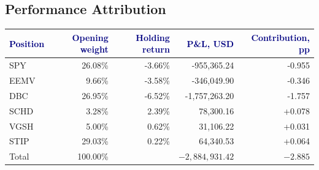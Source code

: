 \documentclass[10pt,a4paper]{article}
\newcommand{\hd}[1]{\textcolor{navy}{\textbf{#1}}}
\begin{document}
\subsection{Performance Attribution}
\begin{center}\small
\begin{tabular}{lrrrr}\toprule
\hd{Position}&\hd{Opening weight}&\hd{Holding return}&\hd{P\&L, USD}&\hd{Contribution, pp}\\\midrule
SPY & 26.08\% & -3.66\% & -955,365.24 & -0.955 \\
EEMV & 9.66\% & -3.58\% & -346,049.90 & -0.346 \\
DBC & 26.95\% & -6.52\% & -1,757,263.20 & -1.757 \\
SCHD & 3.28\% & 2.39\% & 78,300.16 & +0.078 \\
VGSH & 5.00\% & 0.62\% & 31,106.22 & +0.031 \\
STIP & 29.03\% & 0.22\% & 64,340.53 & +0.064 \\
\midrule Total & 100.00\% & & $-2,884,931.42$ & $-2.885$\\\bottomrule
\end{tabular}\end{center}
\end{document}

